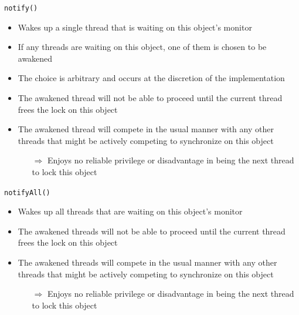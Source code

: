 \begin{frame}[fragile]{\lstinline!notify()!}
  \begin{itemize}
  \item Wakes up a single thread that is waiting on this object's
    monitor
  \item If any threads are waiting on this object, one of them is
    chosen to be awakened
  \item The \alert{choice is arbitrary} and occurs at the discretion
    of the implementation
  \item The awakened thread will not be able to proceed until the
    current thread frees the lock on this object
  \item The awakened thread will compete in the usual manner with any
    other threads that might be actively competing to synchronize on
    this object
    \begin{itemize}
    \item[$\Rightarrow$] Enjoys no reliable privilege or disadvantage
      in being the next thread to lock this object
    \end{itemize}  
  \end{itemize}
\end{frame}

\begin{frame}[fragile]{\lstinline!notifyAll()!}
  \begin{itemize}
  \item Wakes up all threads that are waiting on this object's
    monitor
  \item The awakened threads will not be able to proceed until the
    current thread frees the lock on this object
  \item The awakened threads will compete in the usual manner with any
    other threads that might be actively competing to synchronize on
    this object
    \begin{itemize}
    \item[$\Rightarrow$] Enjoys no reliable privilege or disadvantage
      in being the next thread to lock this object
    \end{itemize}
  \end{itemize}
\end{frame}

